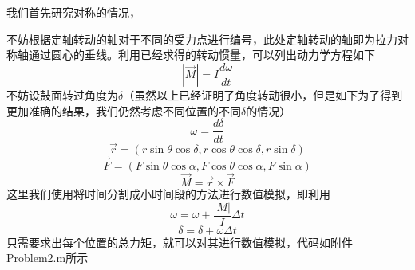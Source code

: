\documentclass[12pt,letterpaper]{article}
\begin{document}
我们首先研究对称的情况，

不妨根据定轴转动的轴对于不同的受力点进行编号，此处定轴转动的轴即为拉力对称轴通过圆心的垂线。利用已经求得的转动惯量，可以列出动力学方程如下
$$|\vec{M}| = I\frac{d\omega}{dt}$$
不妨设鼓面转过角度为$\delta$（虽然以上已经证明了角度转动很小，但是如下为了得到更加准确的结果，我们仍然考虑不同位置的不同$\delta$的情况）
$$\omega = \frac{d\delta}{dt}$$
$$\vec{r} = (r\sin{\theta}\cos{\delta}, r\cos{\theta}\cos{\delta}, r\sin{\delta})$$
$$\vec{F} = (F\sin{\theta}\cos{\alpha}, F\cos{\theta}\cos{\alpha}, F\sin{\alpha})$$
$$\vec{M} = \vec{r} \times \vec{F}$$
这里我们使用将时间分割成小时间段的方法进行数值模拟，即利用
$$\omega = \omega + \frac{|M|}{I} \Delta t$$
$$\delta = \delta + \omega \Delta t$$
只需要求出每个位置的总力矩，就可以对其进行数值模拟，代码如附件Problem2.m所示
\end{document}
